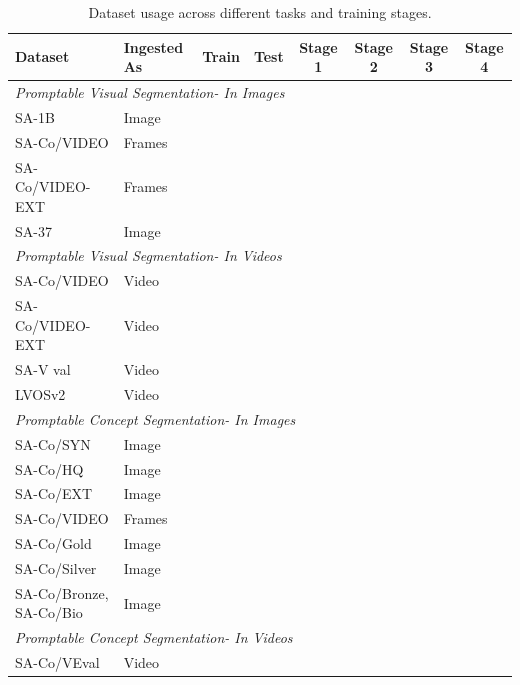 \documentclass[]{fairmeta}
\newcommand{\myappendixtablesize}{8}
\newcommand{\myappendixtablebaselineskip}{9.5}
\newcommand{\pvstasklong}{Promptable Visual Segmentation\xspace}
\newcommand{\tasklong}{Promptable Concept Segmentation\xspace}
\newcommand{\dsname}{{SA-Co}\xspace}
\newcommand{\trainhq}{{\dsname/HQ}\xspace}
\newcommand{\trainsyn}{{\dsname/SYN}\xspace}
\newcommand{\trainext}{{\dsname/EXT}\xspace}
\newcommand{\trainvid}{{\dsname/VIDEO}\xspace}
\newcommand{\evalgold}{{\dsname/Gold}\xspace}
\newcommand{\evalsilv}{{\dsname/Silver}\xspace}
\newcommand{\evalext}{{\dsname/Bronze}\xspace}
\newcommand{\evalbio}{{\dsname/Bio}\xspace}
\newcommand{\evalvid}{{\dsname/VEval}\xspace}
\newcommand{\used}{\checkmark}
\begin{document}
\begin{table}[h]
	\centering
	{\fontsize{\myappendixtablesize}{\myappendixtablebaselineskip}\selectfont
		\begin{tabular}{llcc|cccc}
			\textbf{Dataset} & \textbf{Ingested As} & \textbf{Train} & \textbf{Test} & \textbf{Stage 1} & \textbf{Stage 2} & \textbf{Stage 3} & \textbf{Stage 4} \\
			\midrule
			\multicolumn{8}{l}{\textit{\pvstasklong - In Images}} \\
			\midrule
			SA-1B & Image & \used & & & \used & \used & \used \\
			\trainvid & Frames & \used & & & \used & \used & \used \\
			\trainvid-EXT & Frames & \used & & & \used & \used & \used \\
			SA-37 & Image & & \used & & \used & \used & \used \\
			\midrule
			\multicolumn{8}{l}{\textit{\pvstasklong - In Videos}} \\
			\midrule
			\trainvid & Video & \used & & & & & \used \\
			\trainvid-EXT & Video & \used & & & & & \used \\
			
			SA-V val & Video & & \used & & & & \used \\
			LVOSv2 & Video & & \used & & & & \used \\
			\midrule
			\multicolumn{8}{l}{\textit{\tasklong - In Images}} \\
			\midrule
			\trainsyn & Image & \used & & & \used & & \\
			\trainhq & Image & \used & & & \used & \used &  \\
			\trainext & Image & \used & & & \used & \used &  \\
			\trainvid & Frames & \used & & & \used & \used &  \\
			
			\evalgold & Image & & \used & & \used & \used &  \\
			\evalsilv & Image & & \used & & \used & \used &  \\
			\evalext, \evalbio & Image & & \used & & \used & \used & \\
			\midrule
			\multicolumn{8}{l}{\textit{\tasklong - In Videos}} \\
			\midrule
			\evalvid & Video & & \used & & & & \used \\
		\end{tabular}
	}
    \vspace{-10pt}
	\caption{Dataset usage across different tasks and training stages.}
	\label{tab:dataset_usage}
    \vspace{-10pt}
\end{table}
\end{document}
